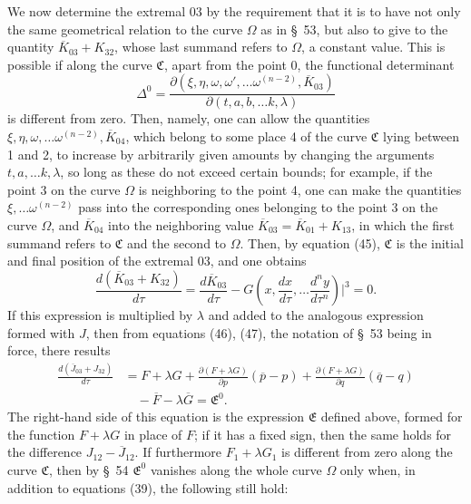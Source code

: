 \documentclass[11pt,a4paper,leqno]{article}
\begin{document}
We now determine the extremal 03 by the requirement that it is to have not only the same geometrical relation to the curve $\Omega$ as in \S~53, but also to give to the quantity $\overline{K}_{03}+K_{32}$, whose last summand refers to $\Omega$, a constant value. This is possible if along the curve $\mathfrak{C}$, apart from the point 0, the functional determinant
\[
\Delta^0=
\frac{\partial(\xi,\eta,\omega,\omega',\ldots\omega^{(n-2)},\overline{K}_{03})}
{\partial(t,a,b,\ldots k,\lambda)}
\]
is different from zero. Then, namely, one can allow the quantities $\xi,\eta,\omega,\ldots\omega^{(n-2)},\overline{K}_{04}$, which belong to some place 4 of the curve $\mathfrak{C}$ lying between 1 and 2, to increase by arbitrarily given amounts by changing the arguments $t,a,\ldots k,\lambda$, so long as these do not exceed certain bounds; for example, if the point 3 on the curve $\Omega$ is neighboring to the point 4, one can make the quantities $\xi,\ldots\omega^{(n-2)}$ pass into the corresponding ones belonging to the point 3 on the curve $\Omega$, and $\overline{K}_{04}$ into the neighboring value $\overline{K}_{03}=\overline{K}_{01}+K_{13}$, in which the first summand refers to $\mathfrak{C}$ and the second to $\Omega$. Then, by equation (45), $\mathfrak{C}$ is the initial and final position of the extremal 03, and one obtains
\begin{equation}\tag{48}
\frac{d(\overline{K}_{03}+K_{32})}{d\tau}
=\frac{d\overline{K}_{03}}{d\tau}
-G\left(x,\frac{dx}{d\tau},\ldots\frac{d^ny}{d\tau^n}\right)\bigg|^3=0.
\end{equation}
If this expression is multiplied by $\lambda$ and added to the analogous expression formed with $J$, then from equations (46), (47), the notation of \S~53 being in force, there results
\[
\begin{aligned}
\frac{d(\overline{J}_{03}+J_{32})}{d\tau}
&=F+\lambda G
+\frac{\partial(F+\lambda G)}{\partial p}(\overline{p}-p)
+\frac{\partial(F+\lambda G)}{\partial q}(\overline{q}-q)\\
&\quad-\overline{F}-\lambda\overline{G}
=\mathfrak{E}^0.
\end{aligned}
\]
The right-hand side of this equation is the expression $\mathfrak{E}$ defined above, formed for the function $F+\lambda G$ in place of $F$; if it has a fixed sign, then the same holds for the difference $J_{12}-\overline{J}_{12}$. If furthermore $F_1+\lambda G_1$ is different from zero along the curve $\mathfrak{C}$, then by \S~54 $\mathfrak{E}^0$ vanishes along the whole curve $\Omega$ only when, in addition to equations (39), the following still hold:
\end{document}
